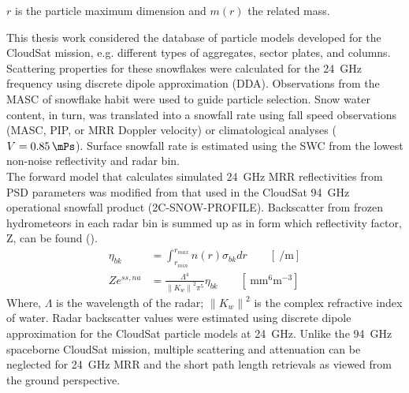 $r$ is the particle maximum dimension and $m(r)$ the related mass. 
\par\medskip\noindent
This thesis work considered the database of particle models developed for the CloudSat mission, e.g. different types of aggregates, sector plates, and columns. Scattering properties for these snowflakes were calculated for the \SI{24}{\giga\hertz} frequency using discrete dipole approximation (DDA). Observations from the MASC of snowflake habit were used to guide particle selection. Snow water content, in turn, was translated into a snowfall rate using fall speed observations (MASC, PIP, or MRR Doppler velocity) or climatological analyses ($V = \SI{0.85}{\mPs}$). Surface snowfall rate is estimated using the SWC from the lowest non-noise reflectivity and radar bin. 
\\
The forward model that calculates simulated \SI{24}{\giga\hertz} MRR reflectivities from PSD parameters was modified from that used in the CloudSat \SI{94}{\giga\hertz} operational snowfall product (2C-SNOW-PROFILE). Backscatter from frozen hydrometeors in each radar bin is summed up as in  form which reflectivity factor, Z, can be found (). 
\begin{align}
	\eta_{bk} & = \int_{r_{min}}^{r_{max}} n(r) \sigma_{bk} dr \qquad [\SI{}{\per\metre}] \label{eq:backscatter} \\
	Ze^{ss,na} & = \frac{\Lambda^4}{\left\| K_w \right\|^2 \pi^5} \eta_{bk} \qquad [\SI{}{\mm^6\metre^{-3}}] \label{eq:singleZ}
\end{align}
Where, $\Lambda$ is the wavelength of the radar; $\left\| K_w \right\|^2$ is the complex refractive index of water. Radar backscatter values were estimated using discrete dipole approximation for the CloudSat particle models at \SI{24}{\giga\hertz}. Unlike the \SI{94}{\giga\hertz} spaceborne CloudSat mission, multiple scattering and attenuation can be neglected for \SI{24}{\giga\hertz} MRR and the short path length retrievals as viewed from the ground perspective.  

